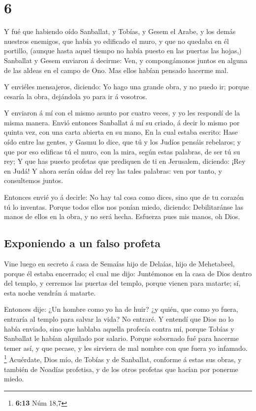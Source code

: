 \hypertarget{section-5}{%
\section{6}\label{section-5}}

 Y fué que habiendo oído Sanballat, y Tobías, y Gesem el
Arabe, y los demás nuestros enemigos, que había yo edificado el muro, y
que no quedaba en él portillo, (aunque hasta aquel tiempo no había
puesto en las puertas las hojas,)  Sanballat y Gesem
enviaron á decirme: Ven, y compongámonos juntos en alguna de las aldeas
en el campo de Ono. Mas ellos habían pensado hacerme mal.

 Y enviéles mensajeros, diciendo: Yo hago una grande obra,
y no puedo ir; porque cesaría la obra, dejándola yo para ir á vosotros.

 Y enviaron á mí con el mismo asunto por cuatro veces, y
yo les respondí de la misma manera.  Envió entonces
Sanballat á mí su criado, á decir lo mismo por quinta vez, con una carta
abierta en su mano,  En la cual estaba escrito: Hase oído
entre las gentes, y Gasmu lo dice, que tú y los Judíos pensáis
rebelaros; y que por eso edificas tú el muro, con la mira, según estas
palabras, de ser tú su rey;  Y que has puesto profetas que
prediquen de ti en Jerusalem, diciendo: ¡Rey en Judá! Y ahora serán
oídas del rey las tales palabras: ven por tanto, y consultemos juntos.

 Entonces envié yo á decirle: No hay tal cosa como dices,
sino que de tu corazón tú lo inventas.  Porque todos ellos
nos ponían miedo, diciendo: Debilitaránse las manos de ellos en la obra,
y no será hecha. Esfuerza pues mis manos, oh Dios.

\hypertarget{exponiendo-a-un-falso-profeta}{%
\subsection{Exponiendo a un falso
profeta}\label{exponiendo-a-un-falso-profeta}}

 Vine luego en secreto á casa de Semaías hijo de Delaías,
hijo de Mehetabeel, porque él estaba encerrado; el cual me dijo:
Juntémonos en la casa de Dios dentro del templo, y cerremos las puertas
del templo, porque vienen para matarte; sí, esta noche vendrán á
matarte.

 Entonces dije: ¿Un hombre como yo ha de huir? ¿y quién,
que como yo fuera, entraría al templo para salvar la vida? No entraré.
 Y entendí que Dios no lo había enviado, sino que hablaba
aquella profecía contra mí, porque Tobías y Sanballat le habían
alquilado por salario.  Porque sobornado fué para hacerme
temer así, y que pecase, y les sirviera de mal nombre con que fuera yo
infamado. \footnote{\textbf{6:13} Núm 18,7}  Acuérdate,
Dios mío, de Tobías y de Sanballat, conforme á estas sus obras, y
también de Noadías profetisa, y de los otros profetas que hacían por
ponerme miedo.

